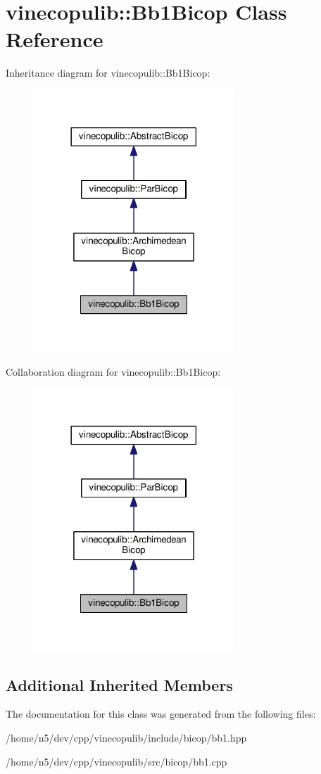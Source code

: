 \hypertarget{classvinecopulib_1_1_bb1_bicop}{}\section{vinecopulib\+:\+:Bb1\+Bicop Class Reference}
\label{classvinecopulib_1_1_bb1_bicop}


Inheritance diagram for vinecopulib\+:\+:Bb1\+Bicop\+:\nopagebreak
\begin{figure}[H]
\begin{center}
\leavevmode
\includegraphics[width=213pt]{classvinecopulib_1_1_bb1_bicop__inherit__graph}
\end{center}
\end{figure}


Collaboration diagram for vinecopulib\+:\+:Bb1\+Bicop\+:\nopagebreak
\begin{figure}[H]
\begin{center}
\leavevmode
\includegraphics[width=213pt]{classvinecopulib_1_1_bb1_bicop__coll__graph}
\end{center}
\end{figure}
\subsection*{Additional Inherited Members}


The documentation for this class was generated from the following files\+:\begin{DoxyCompactItemize}
\item 
/home/n5/dev/cpp/vinecopulib/include/bicop/bb1.\+hpp\item 
/home/n5/dev/cpp/vinecopulib/src/bicop/bb1.\+cpp\end{DoxyCompactItemize}
